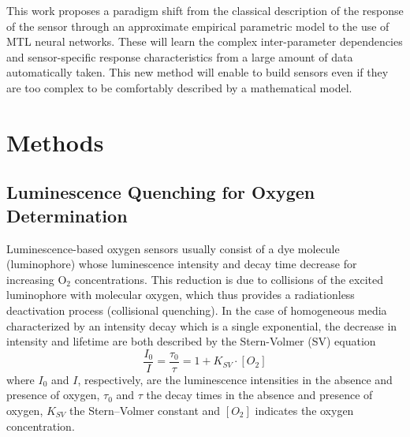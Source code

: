 \documentclass[9pt,twocolumn,twoside,pdftex]{optica}
\begin{document}
This work proposes a paradigm shift from the classical description of the response of the sensor through an approximate empirical parametric model to the use of MTL neural networks. 
These will learn the complex inter-parameter dependencies and sensor-specific response characteristics from a large amount of data automatically taken. This new method will enable to build sensors even if they are too complex to be comfortably described by a mathematical model.




\section{Methods}
\label{sec:methods}

\subsection{Luminescence Quenching for Oxygen Determination}
\label{Theory}

Luminescence-based oxygen sensors usually consist of a dye molecule (luminophore) whose luminescence intensity and decay time decrease for increasing O$_2$ concentrations. This reduction is due to collisions of the excited luminophore with molecular oxygen, which thus provides a radiationless deactivation process (collisional quenching). 
In the case of homogeneous media characterized by an intensity decay which is a single exponential, the decrease in intensity and lifetime are both described by the Stern-Volmer (SV) equation \cite{Lakowicz2006}
\begin{equation}
\frac{I_0}{I}=\frac{\tau_0}{\tau}=1+K_{SV} \cdot \left[O_2\right]
\label{SVe}
\end{equation}
where $I_0$ and $I$, respectively, are the luminescence intensities in the absence and presence of oxygen, $\tau_0$ and $\tau$ the decay times in the absence and presence of oxygen, $K_{SV}$ the Stern–Volmer constant and $\left[O_2\right]$ indicates the oxygen concentration.
\end{document}
